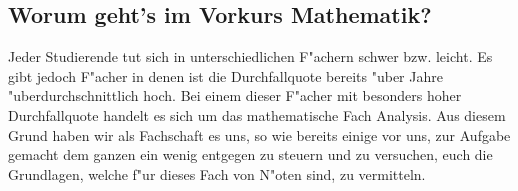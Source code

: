 \subsection{Worum geht's im Vorkurs Mathematik?}
Jeder Studierende tut sich in unterschiedlichen F"achern schwer bzw. leicht.
Es gibt jedoch F"acher in denen ist die Durchfallquote bereits "uber Jahre "uberdurchschnittlich hoch.
Bei einem dieser F"acher mit besonders hoher Durchfallquote handelt es sich um das mathematische Fach Analysis.
Aus diesem Grund haben wir als Fachschaft es uns, so wie bereits einige vor uns, zur Aufgabe gemacht dem ganzen ein wenig entgegen
zu steuern und zu versuchen, euch die Grundlagen, welche f"ur dieses Fach von N"oten sind, zu vermitteln.